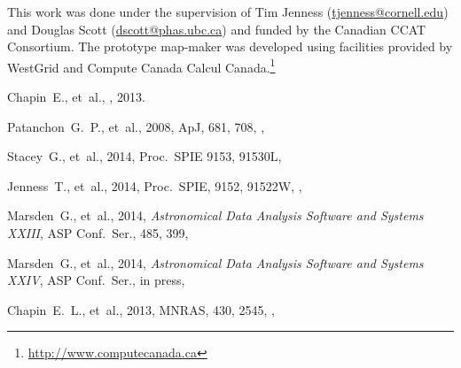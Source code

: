 \documentclass[oneside,11pt]{starlink}
\begin{document}
This work was done under the supervision of Tim Jenness
(\url{tjenness@cornell.edu}) and Douglas Scott
(\url{dscott@phas.ubc.ca}) and funded by the Canadian CCAT
Consortium. The prototype map-maker was developed using facilities
provided by WestGrid and Compute Canada Calcul
Canada.\footnote{\url{http://www.computecanada.ca}}

\begin{thebibliography}{}

Chapin~E., et~al., , 2013.

Patanchon~G.~P., et~al., 2008, ApJ, 681, 708,
,

Stacey~G., et~al., 2014, Proc.\ SPIE 9153, 91530L,

Jenness~T., et~al., 2014, Proc.\ SPIE, 9152, 91522W,
,

Marsden~G., et~al., 2014, \emph{Astronomical Data Analysis Software
  and Systems XXIII}, ASP Conf.\ Ser., 485, 399,

Marsden~G., et~al., 2014, \emph{Astronomical Data Analysis Software
  and Systems XXIV}, ASP Conf.\ Ser., in press,

Chapin~E.~L., et~al., 2013, MNRAS, 430, 2545,
,

\end{thebibliography}
\end{document}
